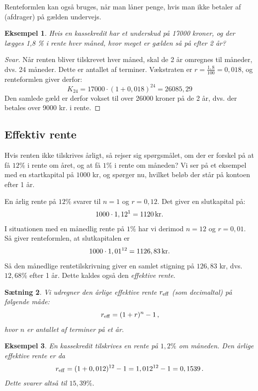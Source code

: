 \documentclass[12pt,oneside,a4paper]{article}
\newtheorem{thm}{Sætning}[section]
\newtheorem{eks}[thm]{Eksempel}
\begin{document}
Renteformlen kan også bruges, når man låner penge, hvis man ikke betaler af
(afdrager) på gælden undervejs.
\begin{tcolorbox}
\begin{eks}
    Hvis en kassekredit har et underskud på 17000 kroner, og der
    lægges 1,8 \% i rente hver måned, hvor meget er gælden så på efter 2 år?
\end{eks}
\begin{proof}[Svar]
    Når renten bliver tilskrevet hver måned, skal de 2 år omregnes til
    måneder, dvs. 24 måneder. Dette er antallet af terminer. Vækstraten er $r =
    \frac{1,8}{100} = 0,018$, og renteformlen giver derfor:
    $$
    K_{24} = 17000 \cdot (1 + 0,018)^{24} = 26085,29
    $$
    Den samlede gæld er derfor vokset til over 26000 kroner på de 2 år, dvs.
    der betales over 9000 kr. i rente.
\end{proof}
\end{tcolorbox}

\subsection{Effektiv rente}
Hvis renten ikke tilskrives årligt, så rejser sig spørgsmålet, om der er
forskel på at få $12\%$ i rente om året, og at få $1\%$ i rente om måneden?  Vi
ser på et eksempel med en startkapital på $1000$ kr, og spørger nu, hvilket
beløb der står på kontoen efter 1 år.

En årlig rente på $12\%$ svarer til $n=1$ og $r=0,12$. Det giver en slutkapital
på:
\[
    1000 \cdot 1,12^1 = 1120 {\,\rm kr.}
\]
I situationen med en månedlig rente på $1\%$ har vi derimod $n=12$ og $r=0,01$.
Så giver renteformlen, at slutkapitalen er
\[
    1000\cdot 1,01^{12} = 1126,83 {\,\rm kr.}
\]
Så den månedlige rentetilskrivning giver en samlet stigning på $126,83$ kr, dvs.
$12,68\%$ efter 1 år. Dette kaldes også den {\em effektive rente}.
\begin{tcolorbox}
\begin{thm}
    Vi udregner den årlige effektive rente $r_{\rm eff}$ (som decimaltal) på
    følgende måde:
    \[
        r_{\rm eff} = (1+r)^n-1\,,
    \]
hvor $n$ er antallet af terminer på et år.
\end{thm}
\end{tcolorbox}
\begin{tcolorbox}
\begin{eks}
    En kassekredit tilskrives en rente på $1,2\%$ om måneden. Den årlige
    effektive rente er da
    \[
        r_{\rm eff} = (1+0,012)^{12}-1 = 1,012^{12}-1 = 0,1539\,.
    \]
    Dette svarer altså til $15,39\%$.
\end{eks}
\end{tcolorbox}
\end{document}
